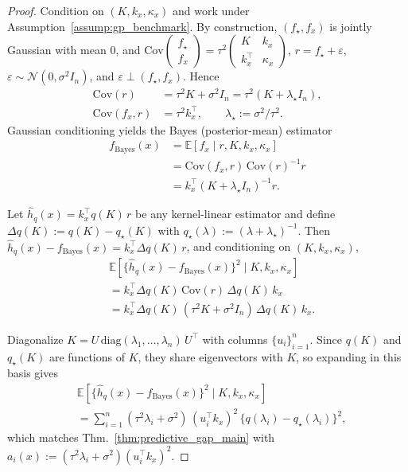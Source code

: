 \documentclass{article}
\theoremstyle{plain}
\theoremstyle{definition}
\theoremstyle{remark}
\begin{document}
\begin{proof}
Condition on $(K,k_x,\kappa_x)$ and work under Assumption~\ref{assump:gp_benchmark}.
By construction, $(f_\star,f_x)$ is jointly Gaussian with mean $0$, and
$\mathrm{Cov}\!\begin{pmatrix} f_\star \\ f_x \end{pmatrix}
=
\tau^2\begin{pmatrix} K & k_x \\ k_x^\top & \kappa_x \end{pmatrix}$,
$r=f_\star+\varepsilon,$ $\varepsilon\sim\mathcal N(0,\sigma^2 I_n)$, and $
\varepsilon\perp(f_\star,f_x)$.
Hence
\begin{align*}
\mathrm{Cov}(r)
&=\tau^2K+\sigma^2 I_n
=\tau^2(K+\lambda_\star I_n), \\
\mathrm{Cov}(f_x,r)
&=\tau^2 k_x^\top,
\qquad
\lambda_\star:=\sigma^2/\tau^2.
\end{align*}
Gaussian conditioning yields the Bayes (posterior-mean) estimator
\begin{align*}
f_{\mathrm{Bayes}}(x)
&=\mathbb E[f_x\mid r,K,k_x,\kappa_x] \\
&=\mathrm{Cov}(f_x,r)\,\mathrm{Cov}(r)^{-1}r \\
&=k_x^\top (K+\lambda_\star I_n)^{-1}r.
\end{align*}

Let $\hat h_q(x)=k_x^\top q(K)\,r$ be any kernel-linear estimator and define
$\Delta q(K):=q(K)-q_\star(K)$ with $q_\star(\lambda):=(\lambda+\lambda_\star)^{-1}$.
Then $\hat h_q(x)-f_{\mathrm{Bayes}}(x)=k_x^\top \Delta q(K)\,r$, and conditioning on $(K,k_x,\kappa_x)$,
\begin{align*}
&\mathbb E\!\left[\{\hat h_q(x)-f_{\mathrm{Bayes}}(x)\}^2\mid K,k_x,\kappa_x\right] \\
&=
k_x^\top \Delta q(K)\,\mathrm{Cov}(r)\,\Delta q(K)\,k_x \\
&=
k_x^\top \Delta q(K)\,(\tau^2K+\sigma^2 I_n)\,\Delta q(K)\,k_x .
\end{align*}

Diagonalize $K=U\,\mathrm{diag}(\lambda_1,\ldots,\lambda_n)\,U^\top$ with columns $\{u_i\}_{i=1}^n$.
Since $q(K)$ and $q_\star(K)$ are functions of $K$, they share eigenvectors with $K$, so expanding in this basis gives
\begin{align*}
&\mathbb E\!\left[\{\hat h_q(x)-f_{\mathrm{Bayes}}(x)\}^2\mid K,k_x,\kappa_x\right] \\
&=
\sum_{i=1}^n (\tau^2\lambda_i+\sigma^2)\,(u_i^\top k_x)^2\,\{q(\lambda_i)-q_\star(\lambda_i)\}^2,
\end{align*}
which matches Thm.~\ref{thm:predictive_gap_main} with $a_i(x):=(\tau^2\lambda_i+\sigma^2)(u_i^\top k_x)^2$.
\end{proof}
\end{document}
